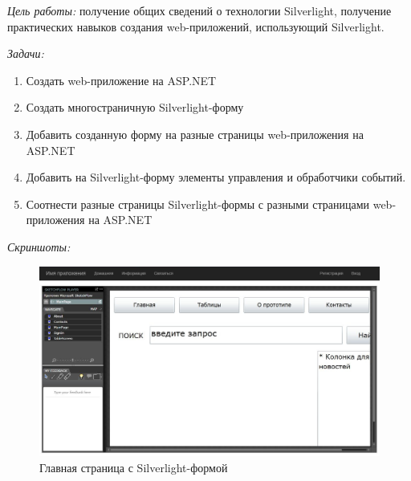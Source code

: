 \documentclass[pscyr, nonums]{hedlab}
\date{}
\begin{document}
    \makeheader
    \emph{Цель работы:} получение общих сведений о технологии Silverlight, получение практических навыков создания web-приложений, использующий Silverlight.

    \emph{Задачи:}
    \begin{enumerate}\itemsep-5pt
        \item Создать web-приложение на ASP.NET
        \item Создать многостраничную Silverlight-форму
        \item Добавить созданную форму на разные страницы web-приложения на ASP.NET 
        \item Добавить на Silverlight-форму элементы управления и обработчики событий.
        \item Соотнести разные страницы Silverlight-формы с разными страницами web-приложения на ASP.NET
    \end{enumerate}

    \emph{Скриншоты:}
    \begin{figure}[ht]
        \center
        \includegraphics[width=1\textwidth]{Lab04_01}
        \caption{Главная страница с Silverlight-формой}
    \end{figure}

    \pagebreak
\end{document}
